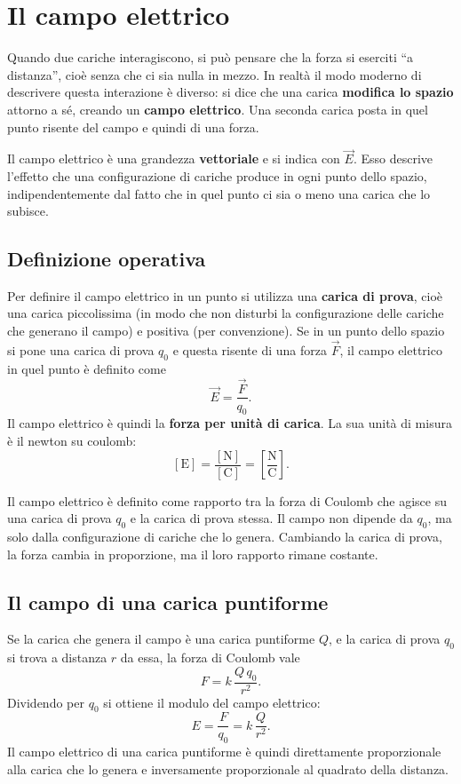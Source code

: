 \section{Il campo elettrico}


Quando due cariche interagiscono, si può pensare che la forza si eserciti ``a distanza'', cioè senza che ci sia nulla in mezzo. In realtà il modo moderno di descrivere questa interazione è diverso: si dice che una carica \textbf{modifica lo spazio} attorno a sé, creando un \textbf{campo elettrico}. Una seconda carica posta in quel punto risente del campo e quindi di una forza.

Il campo elettrico è una grandezza \textbf{vettoriale} e si indica con \(\vec{E}\). Esso descrive l'effetto che una configurazione di cariche produce in ogni punto dello spazio, indipendentemente dal fatto che in quel punto ci sia o meno una carica che lo subisce.

\subsection{Definizione operativa}

Per definire il campo elettrico in un punto si utilizza una \textbf{carica di prova}, cioè una carica piccolissima (in modo che non disturbi la configurazione delle cariche che generano il campo) e positiva (per convenzione). Se in un punto dello spazio si pone una carica di prova \(q_0\) e questa risente di una forza \(\vec{F}\), il campo elettrico in quel punto è definito come
\[
\vec{E} = \frac{\vec{F}}{q_0}.
\]
Il campo elettrico è quindi la \textbf{forza per unità di carica}. La sua unità di misura è il newton su coulomb:
\[
[\text{E}] = \frac{[\text{N}]}{[\text{C}]} = \left[\frac{\text{N}}{\text{C}}\right].
\]

\begin{concetto}
Il campo elettrico è definito come rapporto tra la forza di Coulomb che agisce su una carica di prova \(q_0\) e la carica di prova stessa. Il campo non dipende da \(q_0\), ma solo dalla configurazione di cariche che lo genera. Cambiando la carica di prova, la forza cambia in proporzione, ma il loro rapporto rimane costante.
\end{concetto}

\subsection{Il campo di una carica puntiforme}

Se la carica che genera il campo è una carica puntiforme \(Q\), e la carica di prova \(q_0\) si trova a distanza \(r\) da essa, la forza di Coulomb vale
\[
F = k\,\frac{Q\,q_0}{r^2}.
\]
Dividendo per \(q_0\) si ottiene il modulo del campo elettrico:
\[
E = \frac{F}{q_0} = k\,\frac{Q}{r^2}.
\]
Il campo elettrico di una carica puntiforme è quindi direttamente proporzionale alla carica che lo genera e inversamente proporzionale al quadrato della distanza.

